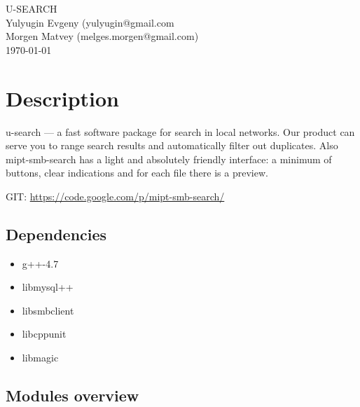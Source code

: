 \documentclass[10pt, oneside, a4paper]{scrbook}
\begin{document}
\hypersetup{pageanchor=false, linkcolor=black, filecolor=black, citecolor=black, urlcolor=blue, pdfauthor = Evgeny Yulyugin, pdftitle=mipt-smb-search guide}

\begin{titlepage}
\vspace*{7cm}
\begin{center}
{\Large U-\/\-S\-E\-A\-R\-C\-H }\\
\vspace*{1cm}
{\large Yulyugin Evgeny (yulyugin@gmail.com}\\
{\large Morgen Matvey (melges.morgen@gmail.com)}\\
\vspace*{0.5cm}
{\small \today}\\
\end{center}
\end{titlepage}
\clearpage
{}
\tableofcontents
\clearpage
{}
\hypersetup{pageanchor=true,citecolor=blue}

\chapter{Description}

u-search --- a fast software package for search in local networks. Our product can serve you to range search results and automatically filter out duplicates. Also mipt-smb-search has a light and absolutely friendly interface: a minimum of buttons, clear indications and for each file there is a preview.

GIT: \url{https://code.google.com/p/mipt-smb-search/}

\section{Dependencies}

\begin{itemize}
  \item g++-4.7
  \item libmysql++
  \item libsmbclient
  \item libcppunit
  \item libmagic
\end{itemize}

\section{Modules overview}
\end{document}
